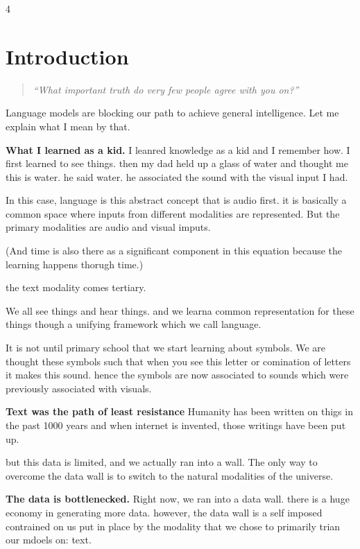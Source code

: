 4


\newpage

\section{Introduction}
\begin{quote}
\textit{``What important truth do very few people agree with you on?''}
\begin{flushright}
\citet{thiel2014zero}
\end{flushright}
\end{quote}

Language models are blocking our path to achieve general intelligence. Let me explain what I mean by that. 

\textbf{What I learned as a kid.} I leanred knowledge as a kid and I remember how. I first learned to see things. then my dad held up a glass of water and thought me this is water. he said water. he associated the sound with the visual input I had. 

In this case, language is this abstract concept that is audio first. it is basically a common space where inputs from different modalities are represented. But the primary modalities are audio and visual imputs. 

(And time is also there as a significant component in this equation because the learning happens thorugh time.)

the text modality comes tertiary. 

We all see things and hear things. and we learna common representation for these things though a unifying framework which we call language. 

It is not until primary school that we start learning about symbols. We are thought these symbols such that when you see this letter or comination of letters it makes this sound. hence the symbols are now associated to sounds which were previously associated with visuals. 


\textbf{Text was the path of least resistance} Humanity has been written on thigs in the past 1000 years and when internet is invented, those writings have been put up. 

but this data is limited, and we actually ran into a wall. The only way to overcome the data wall is to switch to the natural modalities of the universe. 


\textbf{The data is bottlenecked.} Right now, we ran into a data wall. there is a huge economy in generating more data. however, the data wall is a self imposed contrained on us put in place by the modality that we chose to primarily trian our mdoels on: text. 

